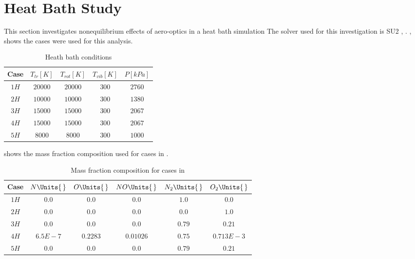 \section{Heat Bath Study\label{ch4:heatBathStudy}}

This section investigates nonequilibrium effects of aero-optics in a heat bath simulation
The solver used for this investigation is \gls{SU2} \cite{Palacios2013},
\cite{Palacios2013a}. , shows the cases were used for
this analysis.
\begin{table}[H]
    \begin{center}
        \begin{tabular}{|c|c|c|c|c|}
        \hline
         Case & $T_{tr}\left[K\right]$ & $T_{rot}\left[K\right]$ &
            $T_{vib}\left[K\right]$ &  $P\left[kPa\right]$ \\ \hline\hline
            $1H$\cite{Gimelshein2022} & $20000$ & $20000$ & $300$ &  $2760$ \\ \hline 
            $2H$\cite{Gimelshein2022} & $10000$ & $10000$ & $300$ & $1380$ \\ \hline 
            $3H$\cite{Gimelshein2022} & $15000$ & $15000$ & $300$ & $2067$ \\
            \hline
            $4H$\cite{Gimelshein2022} & $15000$ & $15000$ & $300$ & $2067$\\
            \hline
            $5H$  & $8000$ & $8000$ & $300$ & $1000$ \\ \hline
        \end{tabular}
        \caption{Heath bath conditions\label{tab:heatBathStudy}}
    \end{center}
\end{table}

     shows the mass fraction composition used for
    cases in . 

    \begin{table}[H]
        \centering
        \begin{tabular}{|c|c|c|c|c|c|}
            \hline
           Case  & $N\Units{\,}$ & $O\Units{\,}$ & $NO\Units{\,}$ & $N_2\Units{\,}$ &
            $O_2\Units{\,}$ \\ \hline\hline
            $1H$ & $0.0$ & $0.0$ & $0.0$ & $1.0$ & $0.0$ \\ \hline
            $2H$ & $0.0$ & $0.0$ & $0.0$ & $0.0$ & $1.0$ \\ \hline
            $3H$ & $0.0$ & $0.0$ & $0.0$ & $0.79$ & $0.21$ \\ \hline
            $4H$ & $6.5E-7$ & $0.2283$ & $0.01026$ & $0.75$ & $0.713E-3$ \\ \hline
            $5H$ & $0.0$ & $0.0$ & $0.0$ & $0.79$ & $0.21$ \\ \hline
        \end{tabular}
        \caption{Mass fraction composition for cases in
        }
    \end{table}


